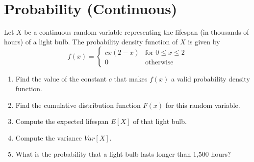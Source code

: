 \documentclass[10pt]{article}
\begin{document}
\begin{enumerate}
\end{enumerate}

\newpage
\section{Probability (Continuous)}
Let $X$ be a continuous random variable representing the lifespan (in thousands of hours) of a light bulb. The probability density function of $X$ is given by
$$f(x) = \begin{cases} 
c x (2 - x) & \text{for } 0 \le x \le 2 \\ 
0 & \text{otherwise} 
\end{cases}$$
\begin{enumerate}[]
    \item[(a)] Find the value of the constant $c$ that makes $f(x)$ a valid probability density function.
    \item[(b)] Find the cumulative distribution function $F(x)$ for this random variable.
    \item[(c)] Compute the expected lifespan $E[X]$ of that light bulb.
    \item[(d)] Compute the variance $Var[X]$.
    \item[(e)] What is the probability that a light bulb lasts longer than 1,500 hours?
\end{enumerate}
\end{document}
